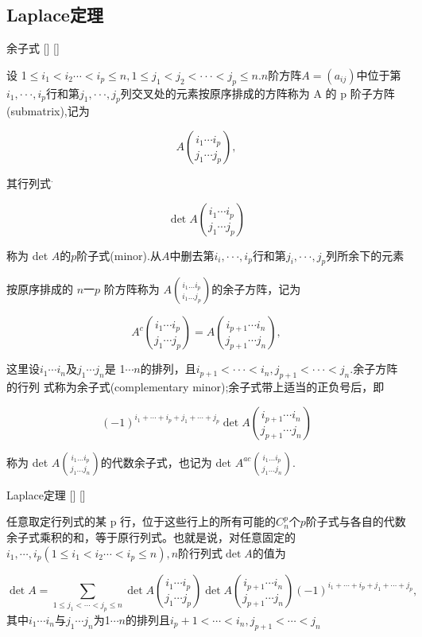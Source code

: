 \documentclass[UTF8]{ctexart}
\begin{document}
	
	
	\subsection{Laplace定理}

    \begin{dfn}
			[]
			{余子式}
			[]
			[]

        设 1$\leqslant i_1<i_2\cdots<i_p\leqslant n,1\leqslant j_1<j_2<\cdotp\cdotp\cdotp<j_p\leqslant n.n$阶方阵$A=(a_{ij})$中位于第$i_1,\cdotp\cdotp\cdotp,i_p$行和第$j_1,\cdotp\cdotp\cdotp,j_p$列交叉处的元素按原序排成的方阵称为 A 的 p 阶子方阵(submatrix),记为

        $$A\binom{i_1\cdots i_p}{j_1\cdots j_p},$$

        其行列式$^{\cdot}$

        $$\det A\binom{i_1\cdots i_p}{j_1\cdots j_p}$$

        称为 det $A$的$p$阶子式(minor).从$A$中删去第$i_i,\cdotp\cdotp\cdotp,i_p$行和第$j_i,\cdotp\cdotp\cdotp,j_p$列所余下的元素

        按原序排成的 $n$一$p$ 阶方阵称为 $A\binom{i_1\ldots i_p}{i_1\ldots j_p}$的余子方阵，记为

        $$A^c\binom{i_1\cdots i_p}{j_1\cdots j_p}=A\binom{i_{p+1}\cdots i_n}{j_{p+1}\cdots j_n},$$

        这里设$i_1\cdots i_n$及$j_1\cdots j_n$是 1$\cdots n$的排列，且$i_{p+1}<\cdotp\cdotp\cdotp<i_n,j_{p+1}<\cdotp\cdotp\cdotp<j_n.$余子方阵的行列
        式称为余子式(complementary minor);余子式带上适当的正负号后，即

        $$(-1)^{i_1+\cdots+i_p+j_1+\cdots+j_p}\det A\binom{i_{p+1}\cdots i_n}{j_{p+1}\cdots j_n}$$

        称为 det $A\binom{i_1\ldots i_p}{j_1\ldots j_n}$的代数余子式，也记为 det $A^{ac}{\binom{i_1\ldots i_p}{j_1\ldots j_n}}.$
    \end{dfn}

    \begin{thm}
			[]
			{Laplace定理}
			[]
			[]

        任意取定行列式的某 p 行，位于这些行上的所有可能的$C_{n}^{p}$个$p$阶子式与各自的代数余子式乘积的和，等于原行列式。也就是说，对任意固定的$i_{1},\cdots,i_{p}\left(1\leqslant i_{1}<i_{2}\cdots<i_{p}\leqslant n\right),n$阶行列式$\det A$的值为

        $$\det A=\sum_{1\leqslant j_{1}<\cdots<j_{p}\leqslant n}\det A\binom{i_{1}\cdots i_{p}}{j_{1}\cdots j_{p}}\det A\binom{i_{p+1}\cdots i_{n}}{j_{p+1}\cdots j_{n}}(-1)^{i_{1}+\cdots+i_{p}+j_{1}+\cdots+j_{p}},$$
        其中$i_1\cdots i_n$与$j_1\cdots j_n$为1$\cdots n$的排列且$i_p+1<\cdots<i_n,j_{p+1}<\cdots<j_n$
    \end{thm}
\end{document}
